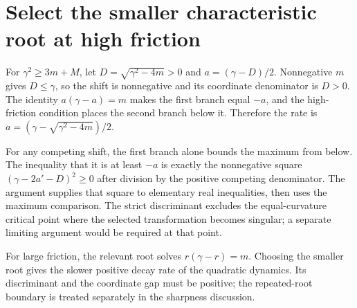 \documentclass[11pt,a4paper]{article}
\begin{document}
\section{\texorpdfstring{Select the smaller characteristic root at high friction}{Select the smaller characteristic root at high friction}}


For \(\gamma^2\ge3m+M\), let \(D=\sqrt{\gamma^2-4m}>0\) and \(a=(\gamma-D)/2\). Nonnegative \(m\) gives \(D\le\gamma\), so the shift is nonnegative and its coordinate denominator is \(D>0\). The identity \(a(\gamma-a)=m\) makes the first branch equal \(-a\), and the high-friction condition places the second branch below it. Therefore the rate is \(a=(\gamma-\sqrt{\gamma^2-4m})/2\).



For any competing shift, the first branch alone bounds the maximum from below. The inequality that it is at least \(-a\) is exactly the nonnegative square \((\gamma-2a'-D)^2\ge0\) after division by the positive competing denominator. The argument supplies that square to elementary real inequalities, then uses the maximum comparison. The strict discriminant excludes the equal-curvature critical point where the selected transformation becomes singular; a separate limiting argument would be required at that point.



For large friction, the relevant root solves \(r(\gamma-r)=m\). Choosing the smaller root gives the slower positive decay rate of the quadratic dynamics. Its discriminant and the coordinate gap must be positive; the repeated-root boundary is treated separately in the sharpness discussion.
\end{document}

